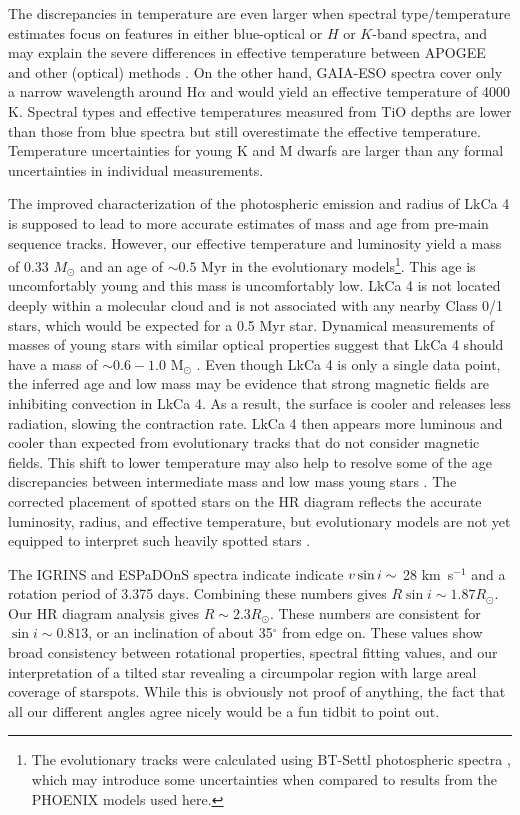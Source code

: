 \documentclass[twocolumn]{emulateapj}%
\begin{document}
The discrepancies in temperature are even larger when spectral type/temperature estimates focus on features in either blue-optical or $H$ or $K$-band spectra, and may explain the severe differences in effective temperature between APOGEE and other (optical) methods \citep{cottaar14}.  On the other hand, GAIA-ESO spectra \citep{frasca15} cover only a narrow wavelength around H$\alpha$ and would yield an effective temperature of 4000 K.   Spectral types and effective temperatures measured from TiO depths \citep{herczeg14} are lower than those from blue spectra but still overestimate the effective temperature.  Temperature uncertainties for young K and M dwarfs are larger than any formal uncertainties in individual measurements.

The improved characterization of the photospheric emission and radius of LkCa 4 is supposed to lead to more accurate estimates of mass and age from pre-main sequence tracks.  However, our effective temperature and luminosity yield a mass of 0.33 $M_\odot$ and an age of $\sim 0.5$ Myr in the \citet{baraffe15} evolutionary models\footnote{The \citet{baraffe15} evolutionary tracks were calculated using BT-Settl photospheric spectra \citep{allard14}, which may introduce some uncertainties when compared to results from the PHOENIX models used here.}.  This age is uncomfortably young and this mass is uncomfortably low.  LkCa 4 is not located deeply within a molecular cloud and is not associated with any nearby Class 0/1 stars, which would be expected for a 0.5 Myr star.  Dynamical measurements of masses of young stars with similar optical properties suggest that LkCa 4 should have a mass of $\sim 0.6-1.0$ M$_\odot$ \citep[e.g.][]{guilloteau14,czekala16,rizzuto16}.  Even though LkCa 4 is only a single data point, the inferred age and low mass may be evidence that strong magnetic fields are inhibiting convection in LkCa 4.  As a result, the surface is cooler and releases less radiation, slowing the contraction rate.  LkCa 4 then appears more luminous and cooler than expected from evolutionary tracks that do not consider magnetic fields.   This shift to lower temperature may also help to resolve some of the age discrepancies between intermediate mass and low mass young stars \citep[e.g.][]{herczeg15}.  The corrected placement of spotted stars on the HR diagram reflects the accurate luminosity, radius, and effective temperature, but evolutionary models are not yet equipped to interpret such heavily spotted stars \citep{somers15}.

The IGRINS and ESPaDOnS spectra indicate indicate $v \sin i\sim$ 28 km~s$^{-1}$ and a rotation period of 3.375 days. Combining these numbers gives $R\sin{i} \sim 1.87 R_{\odot}$. Our HR diagram analysis gives $R \sim 2.3R_{\odot}$. These numbers are consistent for $\sin{i} \sim 0.813$, or an inclination of about 35$^{\circ}$ from edge on. These values show broad consistency between rotational properties, spectral fitting values, and our interpretation of a tilted star revealing a circumpolar region with large areal coverage of starspots.  While this is obviously not proof of anything, the fact that all our different angles agree nicely would be a fun tidbit to point out.
\end{document}
